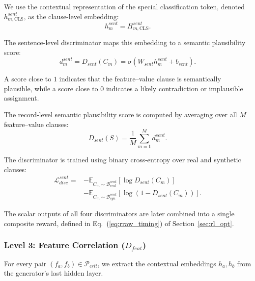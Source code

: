 We use the contextual representation of the special classification token, denoted $h_{m,\mathrm{CLS}}^{sent}$, as the clause-level embedding:
\begin{equation}
h_m^{sent}
=
H_{m,\mathrm{CLS}}^{sent}.
\end{equation}

The sentence-level discriminator maps this embedding to a semantic plausibility score:
\begin{equation}
d_m^{sent}
=
D_{sent}(C_m)
=
\sigma
\left(
W_{sent} h_m^{sent} + b_{sent}
\right).
\end{equation}

A score close to $1$ indicates that the feature--value clause is semantically plausible, while a score close to $0$ indicates a likely contradiction or implausible assignment.

The record-level semantic plausibility score is computed by averaging over all $M$ feature--value clauses:
\begin{equation}
D_{sent}(S)
=
\frac{1}{M}
\sum_{m=1}^{M}
d_m^{sent}.
\end{equation}

The discriminator is trained using binary cross-entropy over real and synthetic clauses:
\begin{equation}
\begin{aligned}
\mathcal{L}_{disc}^{sent}
=
&-
\mathbb{E}_{C_m \sim \mathcal{B}_{real}^{sent}}
\left[
\log D_{sent}(C_m)
\right]\\
&-
\mathbb{E}_{C_m \sim \mathcal{B}_{syn}^{sent}}
\left[
\log(1-D_{sent}(C_m))
\right].
\end{aligned}
\end{equation}



The scalar outputs of all four discriminators are later combined into a single composite reward, defined in Eq.~(\ref{eq:rraw_timing}) of Section~\ref{sec:rl_opt}.

\subsubsection{Level 3: Feature Correlation ($D_{feat}$)}
For every pair $(f_a, f_b) \in \mathcal{P}_{crit}$, we extract the contextual embeddings $h_a, h_b$ from the generator's last hidden layer. 


